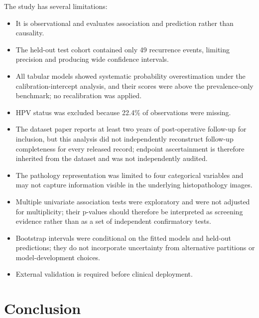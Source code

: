 \documentclass[11pt,a4paper]{article}
\newcommand{\Brier}{\text{Brier}}
\begin{document}
The study has several limitations:

\begin{itemize}

    \item It is observational and evaluates association and prediction rather than causality.

    \item The held-out test cohort contained only 49 recurrence events, limiting precision and producing wide confidence intervals.

    \item All tabular models showed systematic probability overestimation under the calibration-intercept analysis, and their \Brier{} scores were above the prevalence-only benchmark; no recalibration was applied.

    \item HPV status was excluded because 22.4\% of observations were missing.

    \item The dataset paper reports at least two years of post-operative follow-up for inclusion, but this analysis did not independently reconstruct follow-up completeness for every released record; endpoint ascertainment is therefore inherited from the dataset and was not independently audited.

    \item The pathology representation was limited to four categorical variables and may not capture information visible in the underlying histopathology images.

    \item Multiple univariate association tests were exploratory and were not adjusted for multiplicity; their p-values should therefore be interpreted as screening evidence rather than as a set of independent confirmatory tests.

    \item Bootstrap intervals were conditional on the fitted models and held-out predictions; they do not incorporate uncertainty from alternative partitions or model-development choices.

    \item External validation is required before clinical deployment.

\end{itemize}

\section{Conclusion}
\end{document}
